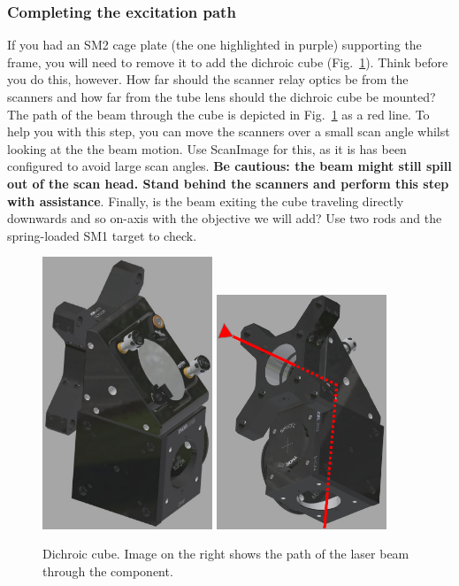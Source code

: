 \documentclass[a4paper]{report}
\begin{document}
\clearpage

\subsubsection{Completing the excitation path}
If you had an SM2 cage plate (the one highlighted in purple) supporting the frame, you will need to remove it to add the dichroic cube (Fig.~\ref{fig:dichroic_holder}).
Think before you do this, however. 
How far should the scanner relay optics be from the scanners and how far from the tube lens should the dichroic cube be mounted?
The path of the beam through the cube is depicted in Fig.~\ref{fig:dichroic_holder} as a red line.
To help you with this step, you can move the scanners over a small scan angle whilst looking at the the beam motion. 
Use ScanImage for this, as it is has been configured to avoid large scan angles.
\textbf{Be cautious: the beam might still spill out of the scan head. Stand behind the scanners and perform this step with assistance}.
Finally, is the beam exiting the cube traveling directly downwards and so on-axis with the objective we will add?
Use two rods and the spring-loaded SM1 target to check. 

\begin{figure}[h]
\center
\includegraphics[width=2.0in]{dichroic_cube.eps}
\includegraphics[width=2.0in]{laser_path_through_cube.eps}
\caption{Dichroic cube. Image on the right shows the path of the laser beam through the component.}
\label{fig:dichroic_holder}
\end{figure}
\end{document}
